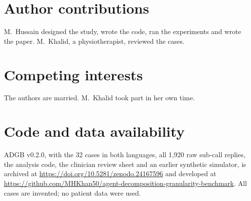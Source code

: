 \documentclass[11pt,a4paper]{article}
\begin{document}
\section*{Author contributions}
M.\ Hussain designed the study, wrote the code, ran the experiments and wrote the paper. M.\ Khalid, a physiotherapist, reviewed the cases.

\section*{Competing interests}
The authors are married. M.\ Khalid took part in her own time.

\section*{Code and data availability}

ADGB v0.2.0, with the 32 cases in both languages, all 1,920 raw sub-call replies, the analysis code, the clinician review sheet and an earlier
synthetic simulator, is archived at \url{https://doi.org/10.5281/zenodo.24167596} and developed at
\url{https://github.com/MHKhan50/agent-decomposition-granularity-benchmark}. All cases are invented; no patient data
were used.



\end{document}
